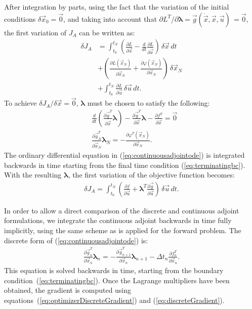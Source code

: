 \documentclass[twocolumn,numbook]{svjour3}          %
\newcommand{\integral}[1]{\int_{t_0}^{t_N} {#1} \, dt}
\newcommand{\pder}[2]{\frac{\partial #1}{\partial #2}}
\newcommand{\dder}[2]{\frac{d #1}{d #2}}
\def\u{{\vec u}}
\def\x{{\vec x}}
\def\p{{\vec{g}}}
\def\0{{\vec 0}}
\def\blambda{{\pmb{\lambda}}}%
\def\M{{\varphi}}
\def\F{f}
\def\myobj{J}
\def\L{L}                    %
\begin{document}
After integration by parts, using the fact that the variation of the initial conditions $\delta \x_0 = \0$, and
taking into account that $\partial \L^T / \partial \blambda = \p(\dot \x, \x, \u) \, = \0$,
the first variation of $\myobj_A$ can be written as:
%
\begin{align}
\label{eq:augmentedobjective}
  \delta \myobj_A
  &= \integral{
    \left(
      \pder{\L}{\x}  -\dder{}{t} \pder{\L}{\dot{\x} }
    \right) \, \delta \x} \nonumber \\
 &+ \left ( \pder{\L(\x_N)}{\dot{\x}_N} + \pder{\M(\x_N)}{\x_N} \right )
  \, \delta \x_N \nonumber \\
  &+ \integral{ \pder{\L}{\u} \, \delta \u }.
\end{align}
%
To achieve $\delta \myobj_A / \delta \x=\0$, $\blambda$ must be chosen
to satisfy the following:
%
\begin{align}
\label{eq:continuousadjointode}
  &\dder{}{t} \left ( \pder{ \p^T }{\dot \x} \blambda \right )
    - \pder{\p^T}{\x} \blambda - \pder{\F^T}{\x} = \0
\\
\label{eq:terminatingbc}
&\pder{\p^T_N}{\dot{\x}_N} \blambda_N = -\pder{\M^T(\x_N)}{\x_N}.
\end{align}
%
The ordinary differential equation in (\ref{eq:continuousadjointode}) is integrated backwards in
time starting from the final time condition
(\ref{eq:terminatingbc}). With the resulting $\blambda$, the first variation of the objective function becomes:
\begin{align}
  \delta \myobj_A = \integral{ \left ( \pder{\F}{\u} + \blambda^T
      \pder{\p}{\u} \right ) \, \delta \u}.
\end{align}


In order to allow a direct comparison of the discrete and continuous adjoint formulations,
we integrate the continuous adjoint backwards in time fully implicitly,
using the same scheme as is applied for the forward problem. The discrete
form of (\ref{eq:continuousadjointode}) is:
\begin{align}
  \label{eq:continuousODE}
  \pder{\p^T_n}{\x_n} \blambda_n
  = -  \pder{\p^T_{n+1}}{\x_n} \blambda_{n+1} -
   \Delta t_n \pder{\F^T_n}{\x_n}.
\end{align}
This equation is solved backwards in time, starting from the boundary condition~(\ref{eq:terminatingbc}).
Once the Lagrange multipliers have been obtained, the gradient is computed using
equations~(\ref{eq:optimizerDiscreteGradient}) and (\ref{eq:discreteGradient}). 
 
\end{document}
